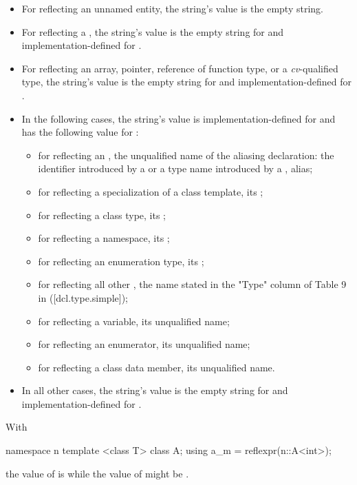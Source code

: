 \begin{std.txt}
\begin{itemdescr}
\begin{itemize}
\item For  reflecting an unnamed entity, the string's value is the empty string.
\item For  reflecting a , the string's value is the empty string for  and implementation-defined for .
\item For  reflecting an array, pointer, reference of function type, or a \emph{cv}-qualified type, the string's value is the empty string for  and implementation-defined for .
\item In the following cases, the string's value is implementation-defined for  and has the following value for :
\begin{itemize}
  \item for  reflecting an , the unqualified name of the aliasing declaration: the identifier introduced by a  or a type name introduced by a , alias;
  \item for  reflecting a specialization of a class template, its ;
  \item for  reflecting a class type, its ;
  \item for  reflecting a namespace, its ;
  \item for  reflecting an enumeration type, its ;
  \item for  reflecting all other , the name stated in the "Type" column of Table 9 in ([dcl.type.simple]);
  \item for  reflecting a variable, its unqualified name;
  \item for  reflecting an enumerator, its unqualified name;
  \item for  reflecting a class data member, its unqualified name.
\end{itemize}
\item In all other cases, the string's value is the empty string for
 and implementation-defined for .
\end{itemize}

\pnum
\begin{note}
With
\begin{codeblock}
namespace n { template <class T> class A; }
using a_m = reflexpr(n::A<int>);
\end{codeblock}
the value of  is  while the value of  might be .
\end{note}


\end{itemdescr}
\end{std.txt}
